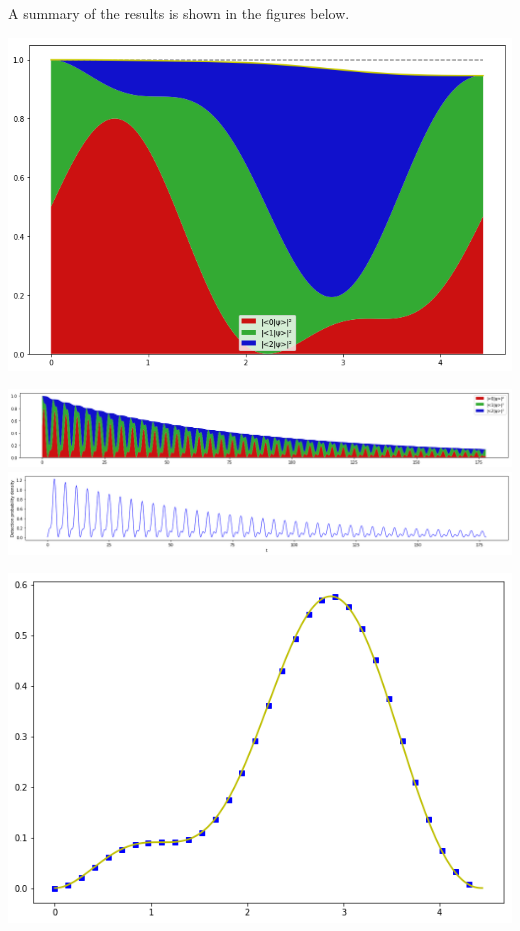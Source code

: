 \documentclass[a0,portrait]{a0poster}
\begin{document}
\begin{multicols}{2}
A summary of the results is shown in the figures below.
\vspace{0.5cm}

\vspace{0.5cm}
\begin{center}
  \includegraphics[width=0.6\linewidth]{2ldetect/qutrit-lossy.png}
\end{center}
\vspace{0.5cm}
\vspace{0.5cm}
\begin{center}
  \includegraphics[width=\linewidth]{2ldetect/qutrit-lossy-long.png}
  \includegraphics[width=\linewidth]{2ldetect/qutrit-lossy-long-detect.png}
\end{center}
\vspace{0.5cm}
\vspace{0.5cm}
\begin{center}
  \includegraphics[width=0.6\linewidth]{2ldetect/qutrit-detect-both.png}

\end{center}
\end{multicols}
\end{document}
